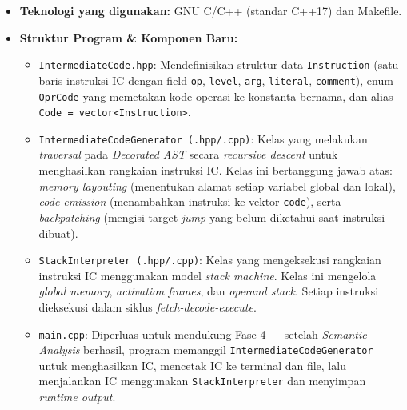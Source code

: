 \documentclass[12pt, a4paper]{article}
\begin{document}
\begin{itemize}
    \item \textbf{Teknologi yang digunakan:} GNU C/C++ (standar C++17) dan Makefile.
    
    \item \textbf{Struktur Program \& Komponen Baru:}
    \begin{itemize}
        \item \texttt{IntermediateCode.hpp}: Mendefinisikan struktur data \texttt{Instruction} (satu baris instruksi IC dengan field \texttt{op}, \texttt{level}, \texttt{arg}, \texttt{literal}, \texttt{comment}), enum \texttt{OprCode} yang memetakan kode operasi ke konstanta bernama, dan alias \texttt{Code = vector<Instruction>}.
        
        \item \texttt{IntermediateCodeGenerator (.hpp/.cpp)}: Kelas yang melakukan \textit{traversal} pada \textit{Decorated AST} secara \textit{recursive descent} untuk menghasilkan rangkaian instruksi IC. Kelas ini bertanggung jawab atas: \textit{memory layouting} (menentukan alamat setiap variabel global dan lokal), \textit{code emission} (menambahkan instruksi ke vektor \texttt{code}), serta \textit{backpatching} (mengisi target \textit{jump} yang belum diketahui saat instruksi dibuat).
        
        \item \texttt{StackInterpreter (.hpp/.cpp)}: Kelas yang mengeksekusi rangkaian instruksi IC menggunakan model \textit{stack machine}. Kelas ini mengelola \textit{global memory}, \textit{activation frames}, dan \textit{operand stack}. Setiap instruksi dieksekusi dalam siklus \textit{fetch-decode-execute}.
        
        \item \texttt{main.cpp}: Diperluas untuk mendukung Fase 4 --- setelah \textit{Semantic Analysis} berhasil, program memanggil \texttt{IntermediateCodeGenerator} untuk menghasilkan IC, mencetak IC ke terminal dan file, lalu menjalankan IC menggunakan \texttt{StackInterpreter} dan menyimpan \textit{runtime output}.
    \end{itemize}
    

\end{itemize}
\end{document}
